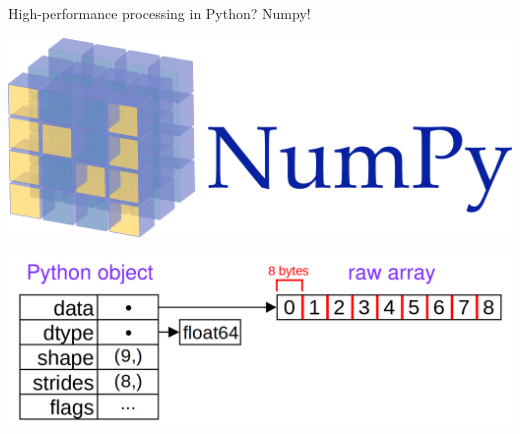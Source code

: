 \documentclass[aspectratio=169]{beamer}
\begin{document}
\begin{frame}{High-performance processing in Python? Numpy!}
\vspace{0.5 cm}
\begin{center}
\includegraphics[width=0.35\linewidth]{numpy-logo.png}

\vspace{1 cm}
\includegraphics[width=0.75\linewidth]{numpy-memory-layout.png}
\end{center}
\end{frame}
\end{document}
